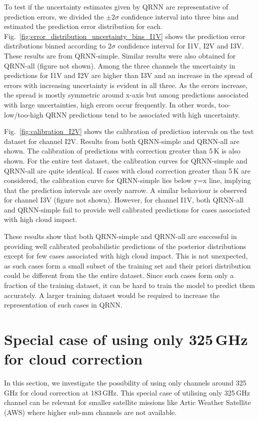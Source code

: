 \documentclass[amt, manuscript]{copernicus}
\begin{document}
To test if the uncertainty estimates given by QRNN are representative of prediction errors, we divided the $\pm2\sigma$ confidence interval into three bins and estimated the prediction error distribution for each. Fig.~\ref{fig:error_distribution_uncertainty_bins_I1V} shows the prediction error distributions binned according to $2\sigma$ confidence interval for I1V, I2V and I3V. These results are from QRNN-simple. Similar results were also obtained for QRNN-all (figure not shown). Among the three channels the uncertainty in predictions for I1V and I2V are higher than I3V and an increase in the spread of errors with increasing uncertainty is evident in all three. As the errors increase, the spread is mostly symmetric around x-axis but among predictions associated with large uncertainties, high errors occur frequently. In other words, too-low/too-high QRNN predictions tend to be associated with high uncertainty. 

Fig.~\ref{fig:calibration_I2V} shows the calibration of prediction intervals on the test dataset for channel I2V. Results from both QRNN-simple and QRNN-all are shown. The calibration of predictions with correction greater than 5\,K is also shown. For the entire test dataset, the calibration curves for QRNN-simple and QRNN-all are quite identical. If cases with cloud correction greater than 5\,K are considered, the calibration curve for QRNN-simple lies  below y=x line, implying that the prediction intervals are overly narrow. A similar behaviour is observed for channel I3V (figure not shown). However, for channel I1V, both QRNN-all and QRNN-simple fail to provide well calibrated predictions for cases associated with high cloud impact. 

These results show that both QRNN-simple and QRNN-all are successful in providing well calibrated probabilistic predictions of the posterior distributions except for few cases associated with high cloud impact. This is not unexpected, as such cases form a small subset of the training set and their
priori distribution could be different from the the entire dataset. Since such cases form only a fraction of the training dataset, it can be hard to train the model to predict them accurately. A larger training dataset would be required to increase the representation of such cases in QRNN.


\section{Special case of using only 325\,GHz for cloud correction}
In this section, we investigate the possibility of using only channels around
325\,GHz for cloud correction at 183\,GHz. This special case of utilising only
325\,GHz channel can be relevant for smaller satellite missions like Artic
Weather Satellite (AWS) where higher sub-mm channels are not available.
\end{document}

